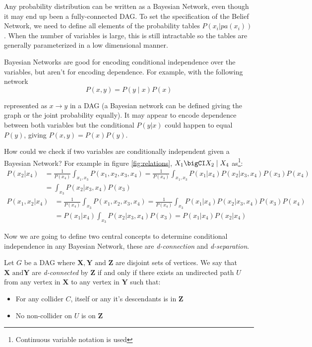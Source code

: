 Any probability distribution can be written as a Bayesian Network, even though
it may end up been a fully-connected DAG.
To set the specification of the Belief Network, we need to define all elements of the probability
tables \(P(x_i|pa(x_i))\). When the number of variables is large, this is still
intractable so the tables are generally parameterized in a low dimensional
manner.

Bayesian Networks are good for encoding conditional independence over the
variables, but aren't for encoding dependence. For example, with the following
network
\[
P(x,y) = P(y\mid x)P(x)
\]

represented as \(x \to y\) in a DAG (a Bayesian network can be defined giving the graph or the joint probability equally).
It may appear to encode dependence between both variables but the
conditional \(P(y|x)\) could happen to equal \(P(y)\), giving \(P(x,y) = P(x)P(y)\).

How could we check if two variables are conditionally independent given a
Bayesian Network? For example in figure \ref{fig:relations}, \(X_1 \bigCI
X_2 \mid X_4\) as\footnote{Continuous variable notation is used}:
\[
\begin{aligned}
P(x_2 | x_4) &= \frac{1}{P(x_4)}\int_{x_1,x_3}P(x_1, x_2, x_3, x_4)
= \frac{1}{P(x_4)}\int_{x_1,x_3}P(x_1|x_4)P(x_2|x_3,x_4)P(x_3)P(x_4)\\
                 &= \int_{x_3}P(x_2|x_3, x_4)P(x_3)
\end{aligned}
\]
\[
\begin{aligned}
P(x_1, x_2 | x_4) &= \frac{1}{P(x_4)}\int_{x_3}P(x_1, x_2, x_3, x_4)
= \frac{1}{P(x_4)}\int_{x_3}P(x_1|x_4)P(x_2|x_3,x_4)P(x_3)P(x_4)\\
                 &= P(x_1|x_4)\int_{x_3}P(x_2|x_3, x_4)P(x_3) = P(x_1|x_4)P(x_2|x_4)
\end{aligned}
\]

Now we are going to define two central concepts to determine conditional
independence in any Bayesian Network, these are \emph{d-connection} and \emph{d-separation}.

\begin{definition}
Let \(G\) be a DAG where \(\bm{X}, \bm{Y} \text{ and } \bm{Z}\)
are disjoint sets of vertices. We say that \(\bm{X} \text{ and
} \bm{Y}\) are \emph{d-connected} by \(\bm{Z}\) if and only if there
exists an undirected path \(U\) from any vertex in \(\bm{X}\) to any
vertex in \(\bm{Y}\) such that:
\begin{itemize}
\item For any collider \(C\), itself or any it's descendants is in \(\bm{Z}\)
\item No non-collider on \(U\) is on \(\bm{Z}\)
\end{itemize}
\end{definition}

